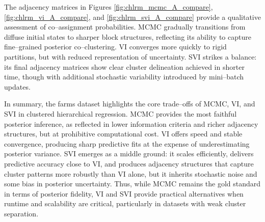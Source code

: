 The adjacency matrices in Figures \ref{fig:chlrm_mcmc_A_compare}, \ref{fig:chlrm_vi_A_compare}, and \ref{fig:chlrm_svi_A_compare} provide a qualitative assessment of co–assignment probabilities. MCMC gradually transitions from diffuse initial states to sharper block structures, reflecting its ability to capture fine–grained posterior co–clustering. VI converges more quickly to rigid partitions, but with reduced representation of uncertainty. SVI strikes a balance: its final adjacency matrices show clear cluster delineation achieved in shorter time, though with additional stochastic variability introduced by mini–batch updates. 

\vspace{0.5cm}

In summary, the farms dataset highlights the core trade–offs of MCMC, VI, and SVI in clustered hierarchical regression. MCMC provides the most faithful posterior inference, as reflected in lower information criteria and richer adjacency structures, but at prohibitive computational cost. VI offers speed and stable convergence, producing sharp predictive fits at the expense of underestimating posterior variance. SVI emerges as a middle ground: it scales efficiently, delivers predictive accuracy close to VI, and produces adjacency structures that capture cluster patterns more robustly than VI alone, but it inherits stochastic noise and some bias in posterior uncertainty. Thus, while MCMC remains the gold standard in terms of posterior fidelity, VI and SVI provide practical alternatives when runtime and scalability are critical, particularly in datasets with weak cluster separation.
